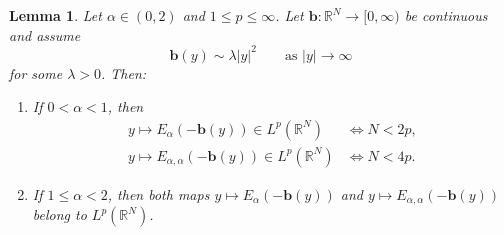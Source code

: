 \documentclass[12pt, reqno]{amsart}
\newcommand{\R}{\ensuremath{\mathbb{R}}}
\newtheorem{lemma}{Lemma}[section]
\begin{document}
\begin{lemma}\label{lem:ML-Lp}
Let $\alpha\in(0,2)$ and $1\le p\le\infty$. Let $\mathbf b:\R^N\to[0,\infty)$ be continuous and assume
\begin{equation}\label{b-y}
\mathbf b(y)\sim \lambda |y|^2\qquad \text{as }|y|\to\infty
\end{equation}
for some $\lambda>0$. Then:
\begin{enumerate}
\item If $0<\alpha<1$, then
\begin{equation}\label{E-alpha-Lp-1}
\begin{aligned}
y\mapsto E_\alpha(-\mathbf b(y))\in L^p(\R^N)
&\Longleftrightarrow N<2p,\\[1mm]
y\mapsto E_{\alpha,\alpha}(-\mathbf b(y))\in L^p(\R^N)
&\Longleftrightarrow N<4p.
\end{aligned}
\end{equation}
\item If $1\le\alpha<2$, then both maps
$y\mapsto E_\alpha(-\mathbf b(y))$ and $y\mapsto E_{\alpha,\alpha}(-\mathbf b(y))$
belong to $L^p(\R^N)$.
\end{enumerate}
\end{lemma}
\end{document}
